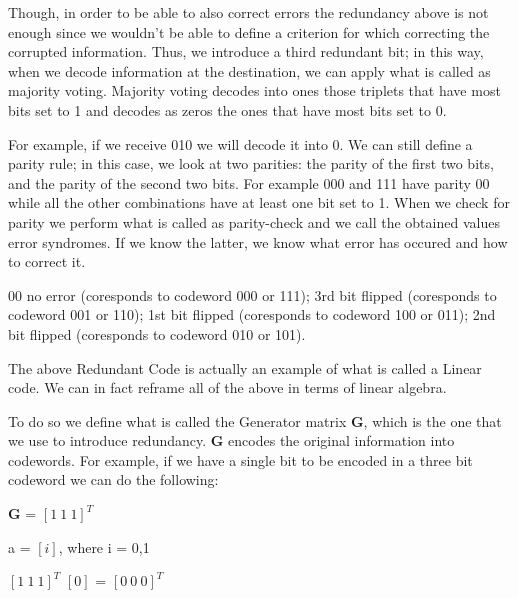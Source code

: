 \documentclass[12pt]{report}
\begin{document}
\begin{minipage}{1 \textwidth}
		Though, in order to be able to also correct errors the redundancy above is not enough since we wouldn't be able to define a criterion for which correcting the corrupted information. Thus, we introduce a third redundant bit; in this way, when we decode information at the destination, we can apply what is called as majority voting. Majority voting decodes into ones those triplets that have most bits set to 1 and decodes as zeros the ones that have most bits set to 0.
		
	
		
	\end{minipage}
	
	
	
	\begin{minipage}{1 \textwidth}
		
		For example, if we receive 010 we will decode it into 0. \newline
		We can still define a parity rule; in this case, we look at two parities: the parity
		of the first two bits, and the parity of the second two bits.  For example 000 and 111 have parity 00 while all the other combinations have at least one bit set to 1.  When we check for parity we perform what is called as parity-check and we call the obtained values error syndromes. If we know the latter, we know what error has occured and how to correct it.\newline
		
		00 no error (coresponds to codeword 000 or 111); 3rd bit flipped (coresponds to codeword 001 or 110); 1st bit flipped (coresponds to codeword 100 or 011); 2nd bit flipped (coresponds to codeword 010 or 101).\newline
		
		The above Redundant Code is actually an example of what is called a Linear code.
		We can in fact reframe all of the above in terms of linear algebra.\newline
		
		To do so we define what is called the Generator matrix  \textbf{G}, which is the one that we use to introduce redundancy. \textbf{G} encodes the original information into codewords. For example, if we have a single bit to be encoded in a three bit codeword we can do the following: \newline 
		
		\begin{center}
			\textbf{G} = $[1 \ 1 \ 1]^{T}$  
		\end{center}
		\begin{center}
			a = $[i]$, where i = 0,1 
		\end{center}
		\begin{center}
			$[1 \ 1 \ 1]^{T}$ $[0]$ = $[0 \ 0 \ 0]^{T}$
		\end{center}
		

\end{minipage}
\end{document}
